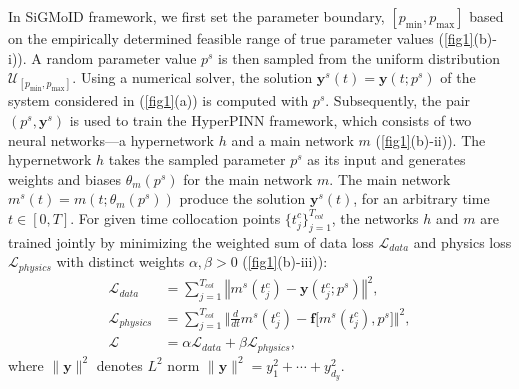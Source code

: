 \documentclass[letterpaper]{article} %
\theoremstyle{thmstyleone}%
\theoremstyle{thmstyletwo}%
\theoremstyle{thmstylethree}%
\begin{document}
In SiGMoID framework, we first set the parameter boundary, $[p_{\text{min}}, p_{\text{max}}]$ based on the empirically determined feasible range of true parameter values (\cref{fig1}(b)-i)). A random parameter value $p^s$ is then sampled from the uniform distribution $\mathcal{U}_{[p_{\text{min}}, p_{\text{max}}]}$. Using a numerical solver, the solution $\mathbf{y}^s(t)=\mathbf{y}(t;p^s)$ of the system considered in (\cref{fig1}(a)) is computed with $p^s$. Subsequently, the pair $(p^s, \mathbf{y}^{s})$ is used to train the HyperPINN framework, which consists of two neural networks---a hypernetwork $h$ and a main network $m$ (\cref{fig1}(b)-ii)). The hypernetwork $h$ takes the sampled parameter $p^s$ as its input and generates weights and biases $\theta_m(p^s)$ for the main network $m$. The main network $m^s(t)=m(t; \theta_m(p^s))$ produce the solution $\mathbf{y}^s(t)$, for an arbitrary time $t\in[0,T]$. For given time collocation points $\{t_{j}^{c}\}_{j=1}^{T_{col}}$, the networks $h$ and $m$ are trained jointly by minimizing the weighted sum of data loss $\mathcal{L}_{data}$ and physics loss $\mathcal{L}_{physics}$ with distinct weights $\alpha,\beta>0$ (\cref{fig1}(b)-iii)):
\begin{align*}
 \mathcal{L}_{data} & = \sum_{j=1}^{T_{col}} \left\Vert m^s(t^c_{j}) - \mathbf{y}(t^c_{j};p^s)\right\Vert^2, \\
 \mathcal{L}_{physics} & = \sum_{j=1}^{T_{col}}  
\Bigg\Vert \frac{d}{dt} m^s(t^c_{j}) - \mathbf{f}\big[m^s(t^c_{j}), p^s \big] \Bigg\Vert^2,\\
 \mathcal{L} &= \alpha\mathcal{L}_{data}+ \beta \mathcal{L}_{physics},
 \end{align*}
where $\|\mathbf{y}\|^2$ denotes $L^2$ norm $\|\mathbf{y}\|^2=y_1^2+\cdots+y_{d_y}^2$.
\end{document}
